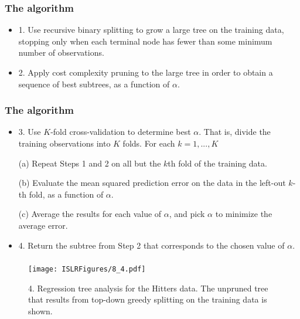\documentclass{beamer}
\begin{document}
         \begin{frame}
         	\frametitle{The algorithm}
         	\begin{itemize}	
         	\item 1. Use recursive binary splitting to grow a large tree on the training
         	data, stopping only when each terminal node has fewer than some
         	minimum number of observations.
         	\item 2. Apply cost complexity pruning to the large tree in order to obtain a
         	sequence of best subtrees, as a function of  $\alpha$.
         
         	\end{itemize}
         \end{frame} 
          \begin{frame}
          	\frametitle{The algorithm}
          	\begin{itemize}	
          		\item 	3. Use $K$-fold cross-validation to determine best  $\alpha$. That is, divide the training
          		observations into $K$ folds. For each $k = 1, . . .,K$
          		
          		(a) Repeat Steps 1 and 2 on all but the $k$th fold of the training data.
          		
          		(b) Evaluate the mean squared prediction error on the data in the
          		left-out $k$-th fold, as a function of  $\alpha$.
          		
          		(c)
          		Average the results for each value of  $\alpha$, and pick  $\alpha$ to minimize the
          		average error.
          		
          		\item 4. Return the subtree from Step 2 that corresponds to the chosen value
          		of  $\alpha$.
          	\end{itemize}
          \end{frame} 
         
         
            
             \begin{frame}
             	\frametitle{ }
             	\begin{figure}
             		\centering
             		
             		\centering
             		\texttt{[image: ISLRFigures/8\_4.pdf]}
             		\caption{4. Regression tree analysis for the Hitters data. The unpruned tree
             			that results from top-down greedy splitting on the training data is shown.
             		}
             	\end{figure}
             \end{frame}
             
\end{document}
